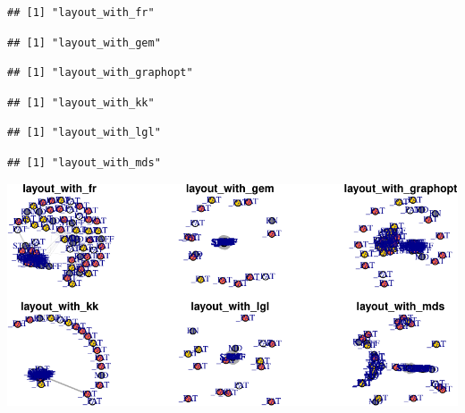 \documentclass[]{elsarticle} %
\makeatletter
\def\maxwidth{\ifdim\Gin@nat@width>\linewidth\linewidth
\else\Gin@nat@width\fi}
\let\Oldincludegraphics\includegraphics
\renewcommand{\includegraphics}[1]{\Oldincludegraphics[width=\maxwidth]{#1}}
\makeatother
\begin{document}
\begin{verbatim}
## [1] "layout_with_fr"
\end{verbatim}

\begin{verbatim}
## [1] "layout_with_gem"
\end{verbatim}

\begin{verbatim}
## [1] "layout_with_graphopt"
\end{verbatim}

\begin{verbatim}
## [1] "layout_with_kk"
\end{verbatim}

\begin{verbatim}
## [1] "layout_with_lgl"
\end{verbatim}

\begin{verbatim}
## [1] "layout_with_mds"
\end{verbatim}

\includegraphics{Flynn_Project_files/figure-latex/shift23 layouts-2.pdf}
\end{document}
